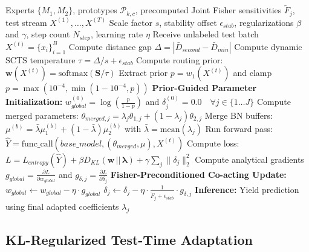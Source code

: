 \documentclass{article}
\theoremstyle{plain}
\theoremstyle{definition}
\theoremstyle{remark}
\begin{document}
\begin{algorithm}[tb]
  \caption{Online Test-Time Model Merging with SCTS, PG-Init, and CLW-Fisher}
  \label{alg:clw_fisher}
  \begin{algorithmic}[1]
    \REQUIRE Experts $\{M_1, M_2\}$, prototypes $\mathcal{P}_{k, c}$, precomputed Joint Fisher sensitivities $\tilde{F}_j$, test stream $X^{(1)}, \dots, X^{(T)}$
    \REQUIRE Scale factor $s$, stability offset $\epsilon_{stab}$, regularizations $\beta$ and $\gamma$, step count $N_{step}$, learning rate $\eta$
      \STATE Receive unlabeled test batch $X^{(t)} = \{x_i\}_{i=1}^B$
      \STATE Compute distance gap $\Delta = |\bar{D}_{second} - \bar{D}_{min}|$
      \STATE Compute dynamic SCTS temperature $\tau = \Delta / s + \epsilon_{stab}$
      \STATE Compute routing prior: $\mathbf{w}(X^{(t)}) = \text{softmax}(\mathbf{S} / \tau)$
      \STATE Extract prior $p = w_1(X^{(t)})$ and clamp $p = \max(10^{-4}, \min(1 - 10^{-4}, p))$
      \STATE \textbf{Prior-Guided Parameter Initialization:}
      \STATE \quad $w_{global}^{(0)} = \log \left( \frac{p}{1 - p} \right)$ and $\delta_j^{(0)} = 0.0 \quad \forall j \in \{1 \dots J\}$
        \STATE Compute merged parameters: $\theta_{merged, j} = \lambda_j \theta_{1, j} + (1 - \lambda_j) \theta_{2, j}$
        \STATE Merge BN buffers: $\mu^{(b)} = \bar{\lambda} \mu_1^{(b)} + (1 - \bar{\lambda}) \mu_2^{(b)}$ with $\bar{\lambda} = \text{mean}(\lambda_j)$
        \STATE Run forward pass: $\hat{Y} = \text{func\_call}(base\_model, (\theta_{merged}, \mu), X^{(t)})$
        \STATE Compute loss: $L = L_{entropy}(\hat{Y}) + \beta D_{KL}(\mathbf{w} \,||\, \mathbf{\lambda}) + \gamma \sum_j \|\delta_j\|_2^2$
        \STATE Compute analytical gradients $g_{global} = \frac{\partial L}{\partial w_{global}}$ and $g_{\delta, j} = \frac{\partial L}{\partial \delta_j}$
        \STATE \textbf{Fisher-Preconditioned Co-acting Update:}
        \STATE \quad $w_{global} \leftarrow w_{global} - \eta \cdot g_{global}$
        \STATE \quad $\delta_j \leftarrow \delta_j - \eta \cdot \frac{1}{\tilde{F}_j + \epsilon_{stab}} \cdot g_{\delta, j}$
      \ENDFOR
      \STATE \textbf{Inference:} Yield prediction using final adapted coefficients $\lambda_j$
    \ENDFOR
  \end{algorithmic}
\end{algorithm}

\subsection{KL-Regularized Test-Time Adaptation}
\end{document}
